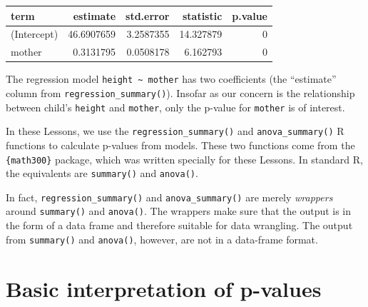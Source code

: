 \documentclass[
  letterpaper,
  DIV=11,
  numbers=noendperiod,
  oneside]{scrreprt}
\begin{document}
\ttfamily 
\begin{tabular}{lrrrr}
\toprule
term & estimate & std.error & statistic & p.value\\
\midrule
(Intercept) & 46.6907659 & 3.2587355 & 14.327879 & 0\\
mother & 0.3131795 & 0.0508178 & 6.162793 & 0\\
\bottomrule
\end{tabular} \normalfont
\bigskip

The regression model \texttt{height\ \textasciitilde{}\ mother} has two
coefficients (the ``estimate'' column from
\texttt{regression\_summary()}). Insofar as our concern is the
relationship between child's \texttt{height} and \texttt{mother}, only
the p-value for \texttt{mother} is of interest.

\begin{tcolorbox}[enhanced jigsaw, colbacktitle=quarto-callout-warning-color!10!white, breakable, opacitybacktitle=0.6, colback=white, left=2mm, arc=.35mm, colframe=quarto-callout-warning-color-frame, coltitle=black, toprule=.15mm, opacityback=0, leftrule=.75mm, bottomtitle=1mm, toptitle=1mm, titlerule=0mm, title=\textcolor{quarto-callout-warning-color}{\faExclamationTriangle}\hspace{0.5em}{Software for P-values}, rightrule=.15mm, bottomrule=.15mm]

In these Lessons, we use the \texttt{regression\_summary()} and
\texttt{anova\_summary()} R functions to calculate p-values from models.
These two functions come from the \texttt{\{math300\}} package, which
was written specially for these Lessons. In standard R, the equivalents
are \texttt{summary()} and \texttt{anova()}.

In fact, \texttt{regression\_summary()} and \texttt{anova\_summary()}
are merely \emph{wrappers} around \texttt{summary()} and
\texttt{anova()}. The wrappers make sure that the output is in the form
of a data frame and therefore suitable for data wrangling. The output
from \texttt{summary()} and \texttt{anova()}, however, are not in a
data-frame format.

\end{tcolorbox}

\hypertarget{basic-interpretation-of-p-values}{%
\section{Basic interpretation of
p-values}\label{basic-interpretation-of-p-values}}
\end{document}
